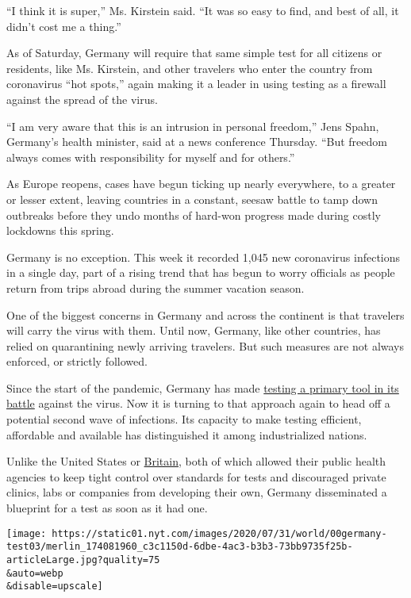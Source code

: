 ``I think it is super,'' Ms. Kirstein said. ``It was so easy to find,
and best of all, it didn't cost me a thing.''

As of Saturday, Germany will require that same simple test for all
citizens or residents, like Ms. Kirstein, and other travelers who enter
the country from coronavirus ``hot spots,'' again making it a leader in
using testing as a firewall against the spread of the virus.

``I am very aware that this is an intrusion in personal freedom,'' Jens
Spahn, Germany's health minister, said at a news conference Thursday.
``But freedom always comes with responsibility for myself and for
others.''

As Europe reopens, cases have begun ticking up nearly everywhere, to a
greater or lesser extent, leaving countries in a constant, seesaw battle
to tamp down outbreaks before they undo months of hard-won progress made
during costly lockdowns this spring.

Germany is no exception. This week it recorded 1,045 new coronavirus
infections in a single day, part of a rising trend that has begun to
worry officials as people return from trips abroad during the summer
vacation season.

One of the biggest concerns in Germany and across the continent is that
travelers will carry the virus with them. Until now, Germany, like other
countries, has relied on quarantining newly arriving travelers. But such
measures are not always enforced, or strictly followed.

Since the start of the pandemic, Germany has made
\href{https://www.nytimes.com/2020/04/18/world/europe/with-broad-random-tests-for-antibodies-germany-seeks-path-out-of-lockdown.html?searchResultPosition=29}{testing
a primary tool in its battle} against the virus. Now it is turning to
that approach again to head off a potential second wave of infections.
Its capacity to make testing efficient, affordable and available has
distinguished it among industrialized nations.

Unlike the United States or
\href{https://www.nytimes.com/2020/04/02/world/europe/uk-coronavirus-testing.html?action=click\&module=RelatedLinks\&pgtype=Article}{Britain},
both of which allowed their public health agencies to keep tight control
over standards for tests and discouraged private clinics, labs or
companies from developing their own, Germany disseminated a blueprint
for a test as soon as it had one.

\texttt{[image: https://static01.nyt.com/images/2020/07/31/world/00germany-test03/merlin\_174081960\_c3c1150d-6dbe-4ac3-b3b3-73bb9735f25b-articleLarge.jpg?quality=75\\\&auto=webp\\\&disable=upscale]}

